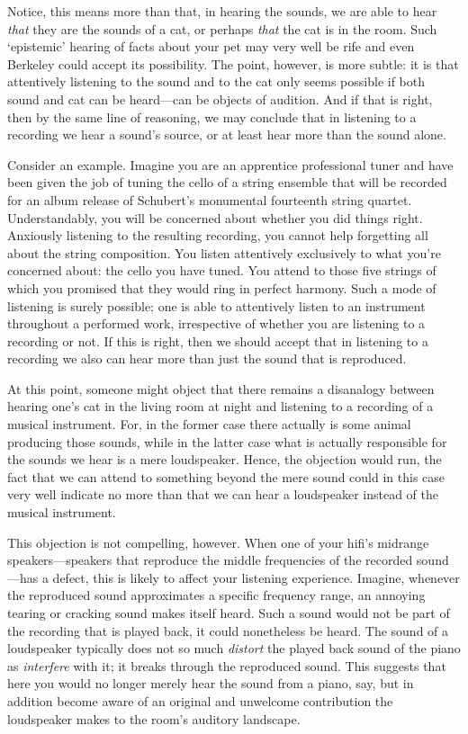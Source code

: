 \documentclass[sloppy, journal, git, bytitle, dodraft]{humapap}
\begin{document}
Notice, this means more than that, in hearing the sounds, we are able to hear \emph{that} they are the sounds of a cat, or perhaps \emph{that} the cat is in the room. Such `epistemic' hearing of facts about your pet may very well be rife and even Berkeley could accept its possibility. The point, however, is more subtle: it is that attentively listening to the sound and to the cat only seems possible if both sound and cat can be heard---can be objects of audition. And if that is right, then by the same line of reasoning, we may conclude that in listening to a recording we hear a sound's source, or at least hear more than the sound alone.

Consider an example. Imagine you are an apprentice professional tuner and have been given the job of tuning the cello of a string ensemble that will be recorded for an album release of Schubert's monumental fourteenth string quartet. Understandably, you will be concerned about whether you did things right. Anxiously listening to the resulting recording, you cannot help forgetting all about the string composition. You listen attentively exclusively to what you're concerned about: the cello you have tuned. You attend to those five strings of which you promised that they would ring in perfect harmony. Such a mode of listening is surely possible; one is able to attentively listen to an instrument throughout a performed work, irrespective of whether you are listening to a recording or not. If this is right, then we should accept that in listening to a recording we also can hear more than just the sound that is reproduced.

At this point, someone might object that there remains a disanalogy between hearing one's cat in the living room at night and listening to a recording of a musical instrument. For, in the former case there actually is some animal producing those sounds, while in the latter case what is actually responsible for the sounds we hear is a mere loudspeaker. Hence, the objection would run, the fact that we can attend to something beyond the mere sound could in this case very well indicate no more than that we can hear a loudspeaker instead of the musical instrument. 

This objection is not compelling, however. When one of your hifi's midrange speakers---speakers that reproduce the middle frequencies of the recorded sound---has a defect, this is likely to affect your listening experience. Imagine, whenever the reproduced sound approximates a specific frequency range, an annoying tearing or cracking sound makes itself heard. Such a sound would not be part of the recording that is played back, it could nonetheless be heard. The sound of a loudspeaker typically does not so much \emph{distort} the played back sound of the piano as \emph{interfere} with it; it breaks through the reproduced sound. This suggests that here you would no longer merely hear the sound from a piano, say, but in addition become aware of an original and unwelcome contribution the loudspeaker makes to the room's auditory landscape. 
\end{document}
